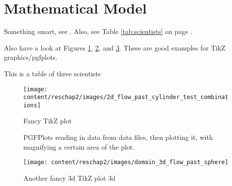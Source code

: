 \section{Mathematical Model}
Something smart, see \cite{EmmitBrown1947}. Also, see Table \ref{tab:scientists} on page \pageref{tab:scientists}.

Also have a look at Figures \ref{fig:test_combinations}, \ref{fig:some_results_plot}, and \ref{fig:3dgraphic}. These are good examples for TikZ graphics/pgfplots.

\begin{table}[h]
  \centering
  \caption{This is a table of three scientists}
  \label{tab:scientists}
\end{table}

\begin{figure}[p]
 \centering
 \texttt{[image: content/reschap2/images/2d\_flow\_past\_cylinder\_test\_combinations]}
 \caption{Fancy TikZ plot}
 \label{fig:test_combinations}
\end{figure}

\begin{figure}[p!]
 \centering
 \captionsetup[sub]{skip=0ex}
 \hfill
%
 \caption{PGFPlots reading in data from data files, then plotting it, with magnifying a certain area of the plot.}
 \label{fig:some_results_plot}
\end{figure}

\begin{figure}[p]
 \centering
 \texttt{[image: content/reschap2/images/domain\_3d\_flow\_past\_sphere]}
 \caption{Another fancy 3d TikZ plot 3d}
 \label{fig:3dgraphic}
\end{figure}
